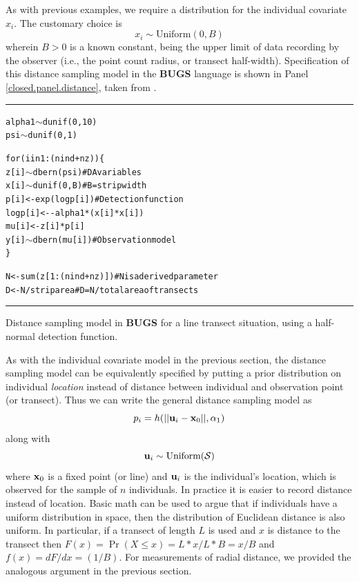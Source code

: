 As with previous examples, we require a distribution for the
individual covariate $x_{i}$. The customary choice is
\[
x_{i} \sim \mbox{Uniform}(0,B)
\]
wherein $B>0$ is a known constant, being the upper limit of data
recording by the observer (i.e., the point count radius, or transect
half-width). 
Specification of this distance sampling model in the {\bf BUGS}
language  is
shown in Panel \ref{closed.panel.distance}, taken from \citet{royle_dorazio:2008}.


\begin{panel}[ht]
\centering
\rule[0.15in]{\textwidth}{.03in}
\begin{minipage}{5in}
\begin{alltt}
alpha1 \(\sim\) dunif(0,10)
psi \(\sim\) dunif(0,1)

for(i in 1:(nind+nz))\{
   z[i] \(\sim\) dbern(psi)          # DA variables
   x[i] \(\sim\) dunif(0,B)          # B=strip width
   p[i] <- exp(logp[i])              # Detection function
   logp[i] <-   - alpha1*(x[i]*x[i])
   mu[i] <- z[i]*p[i]
   y[i] \(\sim\) dbern(mu[i])        # Observation model 
 \}

N<-sum(z[1:(nind+nz)])         # N is a derived parameter
D<- N/striparea                # D = N/total area of transects
\end{alltt}
\end{minipage}
\rule[-0.15in]{\textwidth}{.03in}
\caption{Distance sampling model in {\bf BUGS} for a line transect situation, using a half-normal
detection function.}
\label{closed.panel.distance}
\end{panel}

As with the individual covariate model in the previous section, the
distance sampling model can be equivalently specified by putting a
prior distribution on individual {\it location} instead of distance
between individual and observation point (or transect).  Thus we can
write the general distance sampling model as
\[
p_{i} = h(||{\bf u}_{i} - {\bf x}_0||,\alpha_{1})
\]
along with
\[
 {\bf u}_{i} \sim \mbox{Uniform}({\cal S})
\]
where ${\bf x}_{0}$ is a fixed point (or line) and ${\bf u}_{i}$ is
the individual's location,  which is observed for the sample of $n$ individuals. In
practice it is easier to record distance instead of location.  Basic
math can be used to argue that if individuals have a uniform
distribution in space, then the distribution of Euclidean distance is
also uniform. In particular, if a transect of length $L$ is used and $x$
is distance to the transect then $F(x) = \Pr(X\le x) = L*x/L*B = x/B$ and
$f(x) = dF/dx = (1/B)$. For measurements of radial distance, we
provided the analogous argument in the
previous section.


